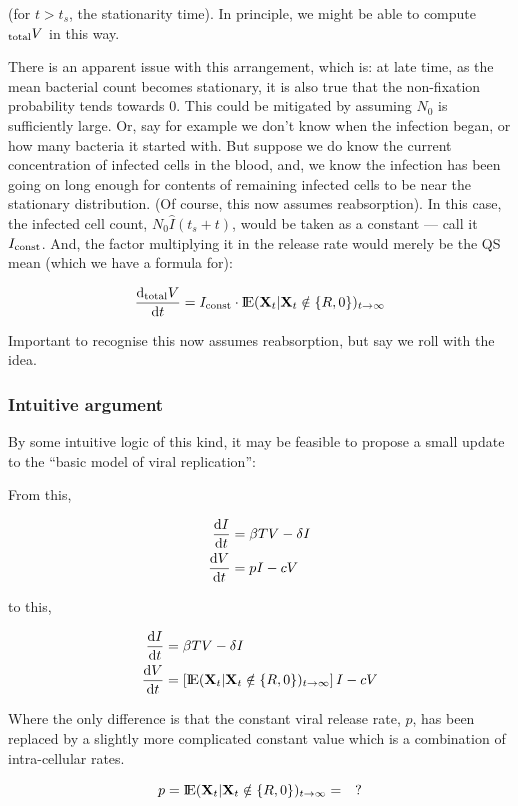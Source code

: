 \noindent
(for $t> t_s$, the stationarity time). In principle, we might be able to compute $_{\text{total}} V$ in this way.\par
There is an apparent issue with this arrangement, which is: at late time, as the mean bacterial count becomes stationary, it is also true that the non-fixation probability tends towards 0. This could be mitigated by assuming $N_0$ is sufficiently large. Or, say for example we don't know when the infection began, or how many bacteria it started with. But suppose we do know the current concentration of infected cells in the blood, and, we know the infection has been going on long enough for contents of remaining infected cells to be near the stationary distribution. (Of course, this now assumes reabsorption). In this case, the infected cell count, $N_0 \hat I(t_s + t)$, would be taken as a constant --- call it $I_{\text{const}}$. And, the factor multiplying it in the release rate would merely be the QS mean (which we have a formula for):

$$\displaystyle\frac{{\rm d} _{\text{total}} V}{{\rm d} t} = I_{\text{const}}\cdot {\rm I}\!{\rm E}({\bf X}_{t} | {\bf X}_{t}\notin\{R, 0\})_{t\to\infty}$$

Important to recognise this now assumes reabsorption, but say we roll with the idea.


\subsubsection*{Intuitive argument}

By some intuitive logic of this kind,  it may be feasible to propose a small update to the ``basic model of viral replication'':\par
From this,

\begin{align*}
\displaystyle\frac{{\rm d} I}{{\rm d} t} &= \beta T V - \delta I\\
\displaystyle\frac{{\rm d} V}{{\rm d} t} &= p I - c V
\end{align*}


\noindent
to this,

\begin{align*}
\displaystyle\frac{{\rm d} I}{{\rm d} t} &= \beta T V - \delta I\\
\displaystyle\frac{{\rm d} V}{{\rm d} t} &= \left[{\rm I}\!{\rm E}({\bf X}_{t} | {\bf X}_{t}\notin\{R, 0\})_{t\to\infty}\right] I - c V
\end{align*}


\noindent
Where the only difference is that the constant viral release rate, $p$, has been replaced by a slightly more complicated constant value which is a combination of intra-cellular rates.

$$p = {\rm I}\!{\rm E}({\bf X}_{t} | {\bf X}_{t}\notin\{R, 0\})_{t\to\infty} =\quad ?$$ 


